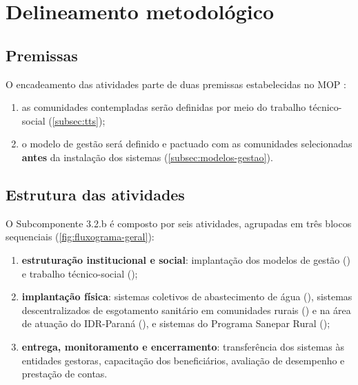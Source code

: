 \section{Delineamento metodológico}
\label{sec:delineamento}

\subsection{Premissas}

O encadeamento das atividades parte de duas premissas estabelecidas no MOP
\cite{mop2026}:

\begin{enumerate}[label=\alph*)]
  \item as comunidades contempladas serão definidas por meio do trabalho
        técnico-social (\autoref{subsec:tts});
  \item o modelo de gestão será definido e pactuado com as comunidades
        selecionadas \textbf{antes} da instalação dos sistemas
        (\autoref{subsec:modelos-gestao}).
\end{enumerate}

\subsection{Estrutura das atividades}

O Subcomponente 3.2.b é composto por seis atividades, agrupadas em três
blocos sequenciais (\autoref{fig:fluxograma-geral}):

\begin{enumerate}[label=\roman*)]
  \item \textbf{estruturação institucional e social}: implantação dos
        modelos de gestão () e trabalho técnico-social
        ();
  \item \textbf{implantação física}: sistemas coletivos de abastecimento de
        água (), sistemas descentralizados de esgotamento
        sanitário em comunidades rurais () e na área de
        atuação do IDR-Paraná (), e sistemas do Programa
        Sanepar Rural ();
  \item \textbf{entrega, monitoramento e encerramento}: transferência dos
        sistemas às entidades gestoras, capacitação dos beneficiários,
        avaliação de desempenho e prestação de contas.
\end{enumerate}


